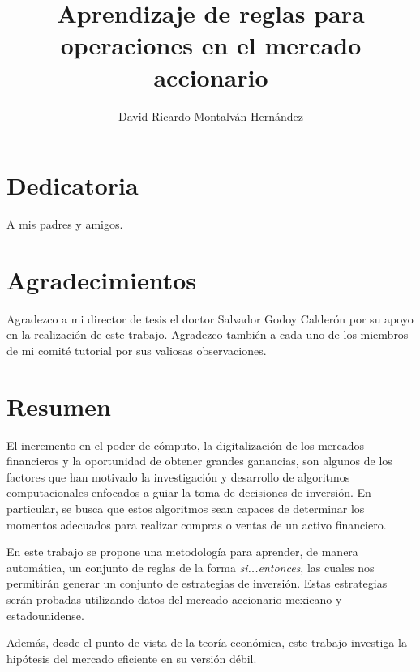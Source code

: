 \documentclass[12pt]{report}
\title{Aprendizaje de reglas para operaciones en el mercado accionario}
\date{}
\author{David Ricardo Montalván Hernández}
\theoremstyle{break}
\theoremstyle{break}
\begin{document}
\sloppy %

{} %

\chapter*{Dedicatoria}
A mis padres y amigos.

\chapter*{Agradecimientos}
Agradezco a mi director de tesis el doctor Salvador Godoy Calderón por su apoyo en la realización de este trabajo.\newline
Agradezco también a cada uno de los miembros de mi comité tutorial por sus valiosas observaciones.

\renewcommand{\contentsname}{Contenido}
\tableofcontents
\renewcommand{\listfigurename}{Lista de figuras}
\listoffigures
\renewcommand{\listtablename}{Lista de tablas}
\renewcommand\tablename{Tabla}
\renewcommand{\bibname}{Referencias}
\renewcommand{\figurename}{Figura}
\renewcommand{\chaptername}{Capítulo}
\listoftables

\chapter*{Resumen}
El incremento en el poder de cómputo, la digitalización de los mercados financieros y la oportunidad de obtener grandes ganancias, son algunos de los factores que han motivado la investigación y desarrollo de algoritmos computacionales enfocados a guiar la toma de decisiones de inversión. En particular, se busca que estos algoritmos sean capaces de determinar los momentos adecuados para realizar compras o ventas de un activo financiero.

En este trabajo se propone una metodología para aprender, de manera automática, un conjunto de reglas de la forma \textit{si...entonces}, las cuales nos permitirán generar un conjunto de estrategias de inversión. Estas estrategias serán probadas utilizando datos del mercado accionario mexicano y estadounidense.

Además, desde el punto de vista de la teoría económica, este trabajo investiga la hipótesis del mercado eficiente en su versión débil.
\end{document}
